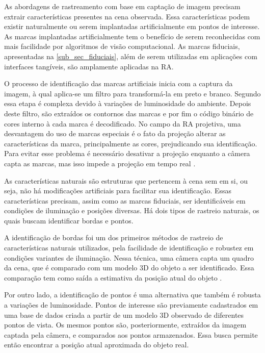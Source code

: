 
As abordagens de rastreamento com base em captação de imagem precisam extrair características presentes na cena observada. Essa características podem existir naturalmente ou serem implantadas artificialmente em pontos de interesse. As marcas implantadas artificialmente tem o benefício de serem reconhecidas com mais facilidade por algoritmos de visão computacional. As marcas fiduciais, apresentadas na \autoref{sub_sec_fiduciais}, além de serem utilizadas em aplicações com interfaces tangíveis, são amplamente aplicadas na RA. 

O processo de identificação das marcas artificiais inicia com a captura da imagem, à qual aplica-se um filtro para transformá-la em preto e branco. Segundo  essa etapa é complexa devido à variações de luminosidade do ambiente. Depois deste filtro, são extraídos os contornos das marcas e por fim o código binário de cores interno à cada marca é decodificado. 
No campo da RA projetiva, uma desvantagem do uso de marcas especiais é o fato da projeção alterar as características da marca, principalmente as cores, prejudicando sua identificação. Para evitar esse problema é necessário desativar a projeção enquanto a câmera capta as marcas, mas isso impede a projeção em tempo real \cite{resch_enhancing_2016}.

As características naturais são estruturas que pertencem à cena sem em si, ou seja, não há modificações artificiais para facilitar sua identificação. Essas características precisam, assim como as marcas fiduciais, ser identificáveis em condições de iluminação e posições diversas. Há dois tipos de rastreio naturais, os quais buscam identificar bordas e pontos.

A identificação de bordas foi um dos primeiros métodos de rastreio de características naturais utilizados, pela facilidade de identificação e robustez em condições variantes de iluminação. Nessa técnica, uma câmera capta um quadro da cena, que é comparado com um modelo 3D do objeto a ser identificado. Essa comparação tem como saída a estimativa da posição atual do objeto \cite{resch_enhancing_2016}. 

Por outro lado, a identificação de pontos é uma alternativa que também é robusta a variações de luminosidade. Pontos de interesse são previamente cadastrados em uma base de dados criada a partir de um modelo 3D observado de diferentes pontos de vista. Os mesmos pontos são, posteriormente, extraídos da imagem captada pela câmera, e comparados aos pontos armazenados. Essa busca permite então encontrar a posição atual aproximada do objeto real. 

